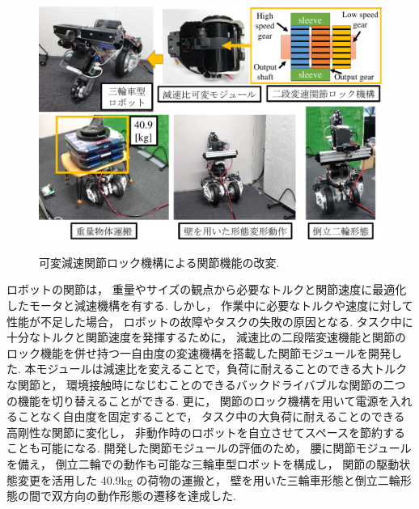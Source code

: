 \documentclass[twocolumn]{d-abst}
\begin{document}
\begin{figure}[tbh]
 \begin{center}
  \begin{minipage}{0.9\columnwidth}
   \includegraphics[width=\columnwidth]{3_module.pdf}
   \caption{可変減速関節ロック機構による関節機能の改変.}
  \end{minipage}
  \label{figure:nowprinting}
 \end{center}
\end{figure}

ロボットの関節は， 重量やサイズの観点から必要なトルクと関節速度に最適化したモータと減速機構を有する. しかし， 作業中に必要なトルクや速度に対して性能が不足した場合， ロボットの故障やタスクの失敗の原因となる. タスク中に十分なトルクと関節速度を発揮するために， 減速比の二段階変速機能と関節の ロック機能を併せ持つ一自由度の変速機構を搭載した関節モジュールを開発した. 本モジュールは減速比を変えることで，負荷に耐えることのできる大トルクな関節と， 環境接触時になじむことのできるバックドライバブルな関節の二つの機能を切り替えることができる. 更に， 関節のロック機構を用いて電源を入れることなく自由度を固定することで， タスク中の大負荷に耐えることのできる高剛性な関節に変化し， 非動作時のロボットを自立させてスペースを節約することも可能になる. 開発した関節モジュールの評価のため， 腰に関節モジュールを備え， 倒立二輪での動作も可能な三輪車型ロボットを構成し， 関節の駆動状態変更を活用した 40.9kg の荷物の運搬と， 壁を用いた三輪車形態と倒立二輪形態の間で双方向の動作形態の遷移を達成した.

\end{document}
